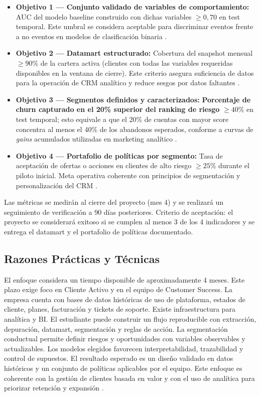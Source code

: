 \begin{itemize}
    \item \textbf{Objetivo 1 — Conjunto validado de variables de comportamiento:} AUC del modelo baseline construido con dichas variables \(\geq 0{,}70\) en test temporal. Este umbral se considera aceptable para discriminar eventos frente a no eventos en modelos de clasificación binaria \citep{Hosmer2013}.
    \item \textbf{Objetivo 2 — Datamart estructurado:} Cobertura del snapshot mensual \(\geq 90\%\) de la cartera activa (clientes con todas las variables requeridas disponibles en la ventana de cierre). Este criterio asegura suficiencia de datos para la operación de CRM analítico y reduce sesgos por datos faltantes \citep{Kumar2010}.
    \item \textbf{Objetivo 3 — Segmentos definidos y caracterizados:} \textbf{Porcentaje de churn capturado en el 20\% superior del ranking de riesgo} \(\geq 40\%\) en test temporal; esto equivale a que el 20\% de cuentas con mayor score concentra al menos el 40\% de los abandonos esperados, conforme a curvas de \textit{gains} acumulados utilizadas en marketing analítico \citep{SAS41683}.
    \item \textbf{Objetivo 4 — Portafolio de políticas por segmento:} Tasa de aceptación de ofertas o acciones en clientes de alto riesgo \(\geq 25\%\) durante el piloto inicial. Meta operativa coherente con principios de segmentación y personalización del CRM \citep{Kumar2010}.
\end{itemize}
Las métricas se medirán al cierre del proyecto (mes 4) y se realizará un seguimiento de verificación a 90 días posteriores. Criterio de aceptación: el proyecto se considerará exitoso si se cumplen al menos 3 de los 4 indicadores y se entrega el datamart y el portafolio de políticas documentado.


\subsection{Razones Prácticas y Técnicas}

El enfoque considera un tiempo disponible de aproximadamente 4 meses. Este plazo exige foco en Cliente Activo y en el equipo de Customer Success. La empresa cuenta con bases de datos históricas de uso de plataforma, estados de cliente, planes, facturación y tickets de soporte. Existe infraestructura para analítica y BI. El estudiante puede construir un flujo reproducible con extracción, depuración, datamart, segmentación y reglas de acción. La segmentación conductual permite definir riesgos y oportunidades con variables observables y actualizables. Los modelos elegidos favorecen interpretabilidad, trazabilidad y control de supuestos. El resultado esperado es un diseño validado en datos históricos y un conjunto de políticas aplicables por el equipo. Este enfoque es coherente con la gestión de clientes basada en valor y con el uso de analítica para priorizar retención y expansión \citep{Kumar2010}.

